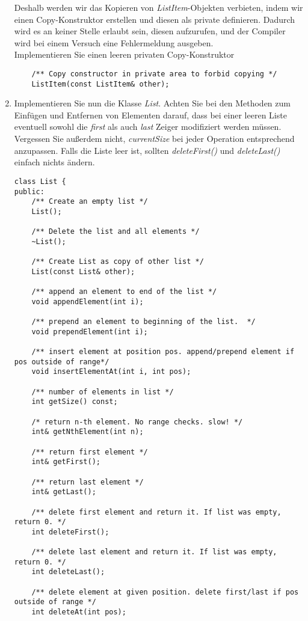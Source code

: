 \documentclass[
  accentcolor=tud1c,	%
  colorbacktitle,		%
  inverttitle,			%
  german,				%
  twoside
]{tudexercise}
\begin{document}
\begin{enumerate}
Deshalb werden wir das Kopieren von \emph{ListItem}-Objekten verbieten, indem wir einen Copy-Konstruktor erstellen und diesen als private definieren. Dadurch wird es an keiner Stelle erlaubt sein, diesen aufzurufen, und der Compiler wird bei einem Versuch eine Fehlermeldung ausgeben. \\

Implementieren Sie einen leeren privaten Copy-Konstruktor
\begin{lstlisting}
	/** Copy constructor in private area to forbid copying */
	ListItem(const ListItem& other);
\end{lstlisting}

\item Implementieren Sie nun die Klasse \emph{List}. Achten Sie bei den Methoden zum Einfügen und Entfernen von Elementen darauf, dass bei einer leeren Liste eventuell sowohl die \emph{first} als auch \emph{last} Zeiger modifiziert werden müssen. Vergessen Sie außerdem nicht, \emph{currentSize} bei jeder Operation entsprechend anzupassen. Falls die Liste leer ist, sollten \emph{deleteFirst()} und \emph{deleteLast()} einfach nichts ändern.
\begin{lstlisting}
class List {
public:
	/** Create an empty list */
	List();

	/** Delete the list and all elements */
	~List();
	
	/** Create List as copy of other list */
	List(const List& other);

	/** append an element to end of the list */
	void appendElement(int i);

	/** prepend an element to beginning of the list.  */
	void prependElement(int i);
	
	/** insert element at position pos. append/prepend element if pos outside of range*/
	void insertElementAt(int i, int pos);

	/** number of elements in list */
	int getSize() const;

	/* return n-th element. No range checks. slow! */
	int& getNthElement(int n);

	/** return first element */
	int& getFirst();

	/** return last element */
	int& getLast();

	/** delete first element and return it. If list was empty, return 0. */
	int deleteFirst();

	/** delete last element and return it. If list was empty, return 0. */
	int deleteLast();
	
	/** delete element at given position. delete first/last if pos outside of range */
	int deleteAt(int pos);


\end{lstlisting}
\end{enumerate}
\end{document}
